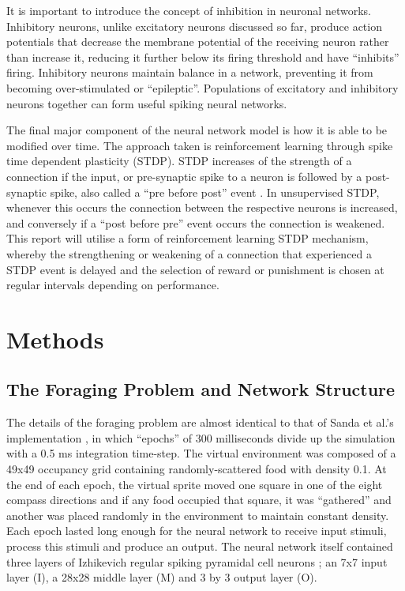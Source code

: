 \documentclass[11pt, twocolumn]{article}
\begin{document}
It is important to introduce the concept of inhibition in neuronal networks. Inhibitory neurons, unlike excitatory neurons discussed so far, produce action potentials that decrease the membrane potential of the receiving neuron rather than increase it, reducing it further below its firing threshold and have ``inhibits'' firing. Inhibitory neurons maintain balance in a network, preventing it from becoming over-stimulated or ``epileptic''. Populations of excitatory and inhibitory neurons together can form useful spiking neural networks.

The final major component of the neural network model is how it is able to be modified over time. The approach taken is reinforcement learning through spike time dependent plasticity (\acs{STDP}). \acs{STDP} increases of the strength of a connection if the input, or pre-synaptic spike to a neuron is followed by a post-synaptic spike, also called a ``pre before post'' event \cite{sanda2017multi}. In unsupervised \acs{STDP}, whenever this occurs the connection between the respective neurons is increased, and conversely if a ``post before pre'' event occurs the connection is weakened. This report will utilise a form of reinforcement learning \acs{STDP} mechanism, whereby the strengthening or weakening of a connection that experienced a \acs{STDP} event is delayed and the selection of reward or punishment is chosen at regular intervals depending on performance.

\section*{Methods}

\subsection*{The Foraging Problem and Network Structure}
The details of the foraging problem are almost identical to that of Sanda et al.'s implementation \cite{sanda2017multi}, in which ``epochs'' of 300 milliseconds divide up the simulation with a 0.5 ms integration time-step. The virtual environment was composed of a 49x49 occupancy grid containing  randomly-scattered food with density 0.1. At the end of each epoch, the virtual sprite moved one square in one of the eight compass directions and if any food occupied that square, it was ``gathered'' and another was placed randomly in the environment to maintain constant density. Each epoch lasted long enough for the neural network to receive input stimuli, process this stimuli and produce an output. The neural network itself contained three layers of Izhikevich regular spiking pyramidal cell neurons \cite{izhikevich2007dynamical}\cite{izhikevich2008large}; an 7x7 input layer (I), a 28x28 middle layer (M) and 3 by 3 output layer (O). 
\end{document}
